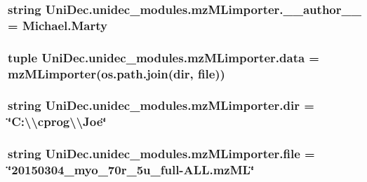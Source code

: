 \subsubsection[{\+\_\+\+\_\+author\+\_\+\+\_\+}]{\setlength{\rightskip}{0pt plus 5cm}string Uni\+Dec.\+unidec\+\_\+modules.\+mz\+M\+Limporter.\+\_\+\+\_\+author\+\_\+\+\_\+ = \textquotesingle{}Michael.\+Marty\textquotesingle{}}\label{namespace_uni_dec_1_1unidec__modules_1_1mz_m_limporter_a82659bee05a1be259670128b1bd42888}
\hypertarget{namespace_uni_dec_1_1unidec__modules_1_1mz_m_limporter_abf8cd37698c991b1af59d02c50fa3750}{}
\subsubsection[{data}]{\setlength{\rightskip}{0pt plus 5cm}tuple Uni\+Dec.\+unidec\+\_\+modules.\+mz\+M\+Limporter.\+data = {\bf mz\+M\+Limporter}(os.\+path.\+join({\bf dir}, {\bf file}))}\label{namespace_uni_dec_1_1unidec__modules_1_1mz_m_limporter_abf8cd37698c991b1af59d02c50fa3750}
\hypertarget{namespace_uni_dec_1_1unidec__modules_1_1mz_m_limporter_a8c288ac27fe16cab6e808d3911d4d6e2}{}
\subsubsection[{dir}]{\setlength{\rightskip}{0pt plus 5cm}string Uni\+Dec.\+unidec\+\_\+modules.\+mz\+M\+Limporter.\+dir = \char`\"{}C\+:\textbackslash{}\textbackslash{}cprog\textbackslash{}\textbackslash{}\+Joe\char`\"{}}\label{namespace_uni_dec_1_1unidec__modules_1_1mz_m_limporter_a8c288ac27fe16cab6e808d3911d4d6e2}
\hypertarget{namespace_uni_dec_1_1unidec__modules_1_1mz_m_limporter_a5dac537b0afac164eee0a8f9d7979a56}{}
\subsubsection[{file}]{\setlength{\rightskip}{0pt plus 5cm}string Uni\+Dec.\+unidec\+\_\+modules.\+mz\+M\+Limporter.\+file = \char`\"{}20150304\+\_\+myo\+\_\+70r\+\_\+5u\+\_\+full-\/\+A\+L\+L.\+mz\+M\+L\char`\"{}}\label{namespace_uni_dec_1_1unidec__modules_1_1mz_m_limporter_a5dac537b0afac164eee0a8f9d7979a56}
\hypertarget{namespace_uni_dec_1_1unidec__modules_1_1mz_m_limporter_ac2d823261c18ce098ddb2cdde3a435bf}{}
